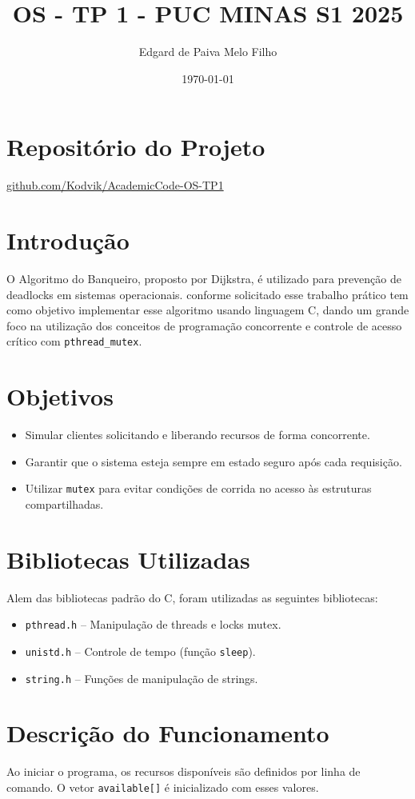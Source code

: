\documentclass[12pt]{article}
\title{OS - TP 1 - PUC MINAS S1 2025}
\author{Edgard de Paiva Melo Filho}
\date{\today}
\begin{document}
\maketitle

\section*{Repositório do Projeto}
\href{https://github.com/Kodvik/AcademicCode-OS-TP1}{github.com/Kodvik/AcademicCode-OS-TP1}

\section{Introdução}
O Algoritmo do Banqueiro, proposto por Dijkstra, é utilizado para prevenção de deadlocks em sistemas operacionais. conforme solicitado esse trabalho prático tem como objetivo implementar esse algoritmo usando linguagem C, dando um grande foco na utilização dos conceitos de programação concorrente e controle de acesso crítico com \texttt{pthread\_mutex}.

\section{Objetivos}
\begin{itemize}
  \item Simular clientes solicitando e liberando recursos de forma concorrente.
  \item Garantir que o sistema esteja sempre em estado seguro após cada requisição.
  \item Utilizar \texttt{mutex} para evitar condições de corrida no acesso às estruturas compartilhadas.
\end{itemize}

\section{Bibliotecas Utilizadas}
Alem das bibliotecas padrão do C, foram utilizadas as seguintes bibliotecas:
\begin{itemize}
  \item \texttt{pthread.h} -- Manipulação de threads e locks mutex.
  \item \texttt{unistd.h} -- Controle de tempo (função \texttt{sleep}).
  \item \texttt{string.h} -- Funções de manipulação de strings.
\end{itemize}

\section{Descrição do Funcionamento}
Ao iniciar o programa, os recursos disponíveis são definidos por linha de comando. O vetor \texttt{available[]} é inicializado com esses valores.
\end{document}
